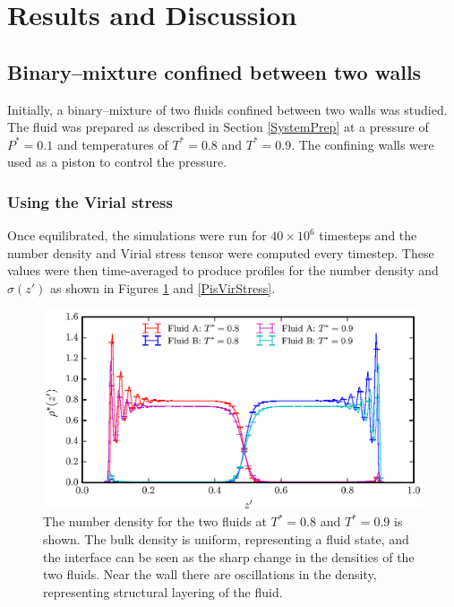 \section{Results and Discussion}
\subsection{Binary--mixture confined between two walls}\label{Piston}
Initially, a binary--mixture of two fluids confined between two walls was studied. 
The fluid was prepared as described in Section \ref{SystemPrep} at a pressure of $P^{*} = 0.1$ and temperatures of $T^{*} = 0.8$ and $T^{*} = 0.9$.
The confining walls were used as a piston to control the pressure.

\subsubsection{Using the Virial stress}\label{VirialStressPiston}
Once equilibrated, the simulations were run for $40 \times 10^{6}$ timesteps and the number density and Virial stress tensor were computed every timestep.
These values were then time-averaged to produce profiles for the number density and $\sigma(z')$ as shown in Figures \ref{PisVirRho} and \ref{PisVirStress}. 

\FloatBarrier
\begin{figure}[h]
\centering
\includegraphics[scale=0.8]{PisVirRho}
\caption{The number density for the two fluids at $T^{*} = 0.8$ and $T^{*} = 0.9$ is shown. 
The bulk density is uniform, representing a fluid state, and the interface can be seen as the sharp change in the densities of the two fluids.
Near the wall there are oscillations in the density, representing structural layering of the fluid.}
\label{PisVirRho}
\end{figure}

